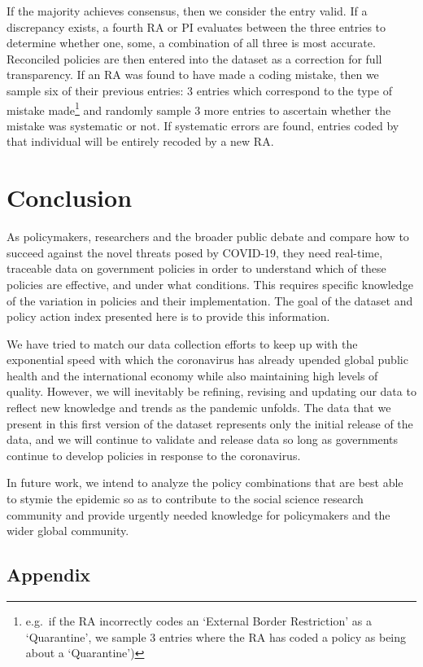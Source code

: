\documentclass[]{article}
\let\rmarkdownfootnote\footnote%
\def\footnote{\protect\rmarkdownfootnote}
\begin{document}
If the majority achieves consensus, then we consider the entry valid. If a discrepancy exists, a fourth RA or PI evaluates between the three entries to determine whether one, some, a combination of all three is most accurate. Reconciled policies are then entered into the dataset as a correction for full transparency. If an RA was found to have made a coding mistake, then we sample six of their previous entries: 3 entries which correspond to the type of mistake made\footnote{e.g.~if the RA incorrectly codes an `External Border Restriction' as a `Quarantine', we sample 3 entries where the RA has coded a policy as being about a `Quarantine')} and randomly sample 3 more entries to ascertain whether the mistake was systematic or not. If systematic errors are found, entries coded by that individual will be entirely recoded by a new RA.

\hypertarget{conclusion}{%
\section{Conclusion}\label{conclusion}}

As policymakers, researchers and the broader public debate and compare how to succeed against the novel threats posed by COVID-19, they need real-time, traceable data on government policies in order to understand which of these policies are effective, and under what conditions. This requires specific knowledge of the variation in policies and their implementation. The goal of the dataset and policy action index presented here is to provide this information.

We have tried to match our data collection efforts to keep up with the exponential speed with which the coronavirus has already upended global public health and the international economy while also maintaining high levels of quality. However, we will inevitably be refining, revising and updating our data to reflect new knowledge and trends as the pandemic unfolds. The data that we present in this first version of the dataset represents only the initial release of the data, and we will continue to validate and release data so long as governments continue to develop policies in response to the coronavirus.

In future work, we intend to analyze the policy combinations that are best able to stymie the epidemic so as to contribute to the social science research community and provide urgently needed knowledge for policymakers and the wider global community.

\hypertarget{appendix}{%
\subsection*{Appendix}\label{appendix}}
\end{document}
